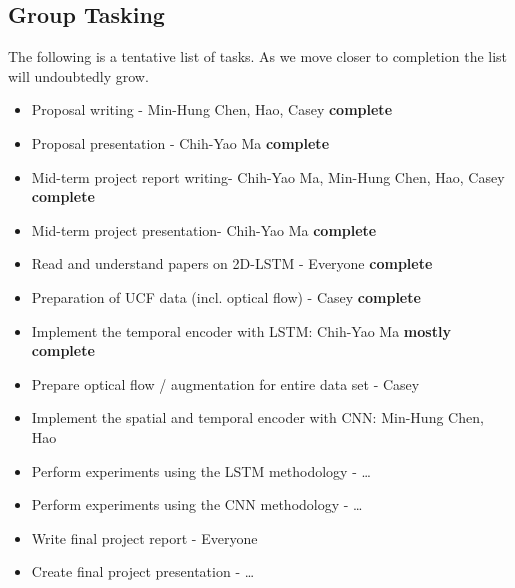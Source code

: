 \subsection*{Group Tasking}
The following is a tentative list of tasks. As we move closer to completion the list will undoubtedly grow. 
\begin{itemize}
\item Proposal writing - Min-Hung Chen, Hao, Casey \qquad \textbf{complete}
\item Proposal presentation - Chih-Yao Ma \qquad \textbf{complete}
\item Mid-term project report writing- Chih-Yao Ma, Min-Hung Chen, Hao, Casey \qquad \textbf{complete}
\item Mid-term project presentation- Chih-Yao Ma \qquad \textbf{complete}
\item Read and understand papers on 2D-LSTM - Everyone \qquad \textbf{complete}
\item Preparation of UCF data (incl. optical flow) - Casey \qquad \textbf{complete}
\item Implement the temporal encoder with LSTM: Chih-Yao Ma \qquad \textbf{mostly complete}
\item Prepare optical flow / augmentation for entire data set - Casey
\item Implement the spatial and temporal encoder with CNN: Min-Hung Chen, Hao
\item Perform experiments using the LSTM methodology - \dots
\item Perform experiments using the CNN methodology - \dots
\item Write final project report - Everyone
\item Create final project presentation - \dots
\end{itemize}

